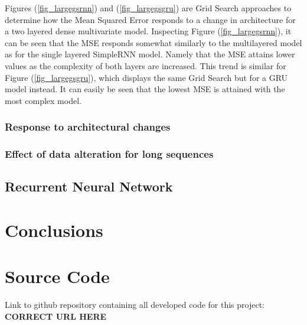 \documentclass
[twocolumn,
secnumarabic,
nobibnotes,
aps,
prl,
reprint,
groupedaddress,
amsmath,
amssymb,
]{revtex4-2}
\begin{document}
Figures (\ref{fig_largegsrnn}) and (\ref{fig_largegsgru}) are Grid Search approaches to determine how the Mean Squared Error responds to a change in architecture for a two layered dense multivariate model. Inspecting Figure (\ref{fig_largegsrnn}), it can be seen that the MSE responds somewhat similarly to the multilayered model as for the single layered SimpleRNN model. Namely that the MSE attains lower values as the complexity of both layers are increased. This trend is similar for Figure (\ref{fig_largegsgru}), which displays the same Grid Search but for a GRU model instead. It can easily be seen that the lowest MSE is attained with the most complex model.

\subsubsection{Response to architectural changes}


\subsubsection{Effect of data alteration for long sequences}


\subsection{Recurrent Neural Network}

\section{Conclusions}

\appendix

\section{Source Code}
\label{sec:sc}
Link to github repository containing all developed code for this project: \textbf{CORRECT URL HERE}%





\end{document}
